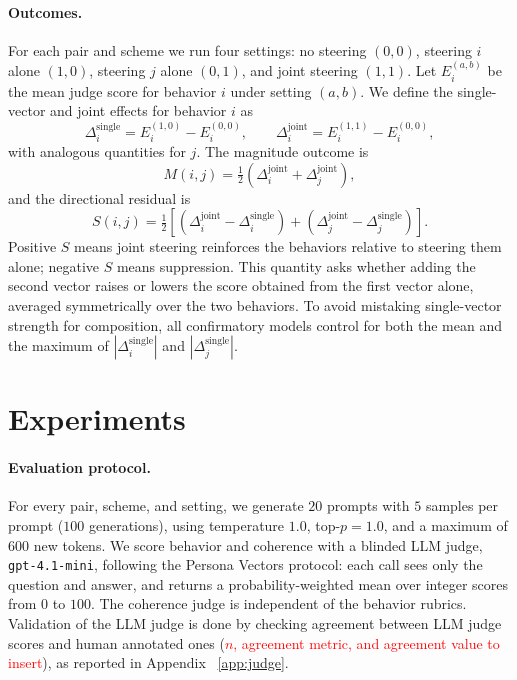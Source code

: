 \documentclass{article}
\begin{document}
\paragraph{Outcomes.}
For each pair and scheme we run four settings: no steering $(0,0)$, steering $i$ alone $(1,0)$,
steering $j$ alone $(0,1)$, and joint steering $(1,1)$. Let $E_i^{(a,b)}$ be the mean judge score for
behavior $i$ under setting $(a,b)$. We define the single-vector and joint effects for behavior $i$ as
\begin{equation}
  \Delta_i^{\mathrm{single}}=E_i^{(1,0)}-E_i^{(0,0)},
  \qquad
  \Delta_i^{\mathrm{joint}}=E_i^{(1,1)}-E_i^{(0,0)},
\end{equation}
with analogous quantities for $j$. The magnitude outcome is
\begin{equation}
  M(i,j)=\tfrac{1}{2}\left(\Delta_i^{\mathrm{joint}}+\Delta_j^{\mathrm{joint}}\right),
  \label{eq:mag}
\end{equation}
and the directional residual is
\begin{equation}
  S(i,j)=\tfrac{1}{2}\left[(\Delta_i^{\mathrm{joint}}-\Delta_i^{\mathrm{single}})
  +(\Delta_j^{\mathrm{joint}}-\Delta_j^{\mathrm{single}})\right].
  \label{eq:directional}
\end{equation}
Positive $S$ means joint steering reinforces the behaviors relative to steering them alone; negative
$S$ means suppression. This quantity asks whether adding the second vector raises or lowers the
score obtained from the first vector alone, averaged symmetrically over the two behaviors. To avoid mistaking single-vector strength for composition, all confirmatory
models control for both the mean and the maximum of
$|\Delta_i^{\mathrm{single}}|$ and $|\Delta_j^{\mathrm{single}}|$.

\section{Experiments}

\paragraph{Evaluation protocol.}
For every pair, scheme, and setting, we generate $20$ prompts with $5$ samples per prompt
($100$ generations), using temperature $1.0$, top-$p=1.0$, and a maximum of $600$ new tokens. We
score behavior and coherence with a blinded LLM judge, \texttt{gpt-4.1-mini}, following the Persona
Vectors \citep{chen2025persona} protocol: each call sees only the question and answer, and returns a probability-weighted
mean over integer scores from $0$ to $100$. The coherence judge is independent of the behavior
rubrics. Validation of the LLM judge is done by checking agreement between LLM judge scores and human annotated ones (\textcolor{red}{$n$, agreement metric, and agreement value to insert}), as reported in Appendix ~\ref{app:judge}.
\end{document}
